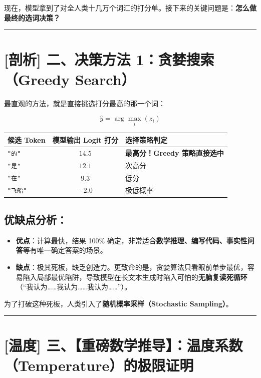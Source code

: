 现在，模型拿到了对全人类十几万个词汇的打分单。接下来的关键问题是：\textbf{怎么做最终的选词决策？}

\vspace{0.8em}\hrule\vspace{0.8em}

\section{[剖析] 二、决策方法 1：贪婪搜索（Greedy Search）}

最直观的方法，就是直接挑选打分最高的那一个词：

\[
\hat{y} = \arg\max_{i} (z_i)
\]

\begin{center}
\small
\begin{tabularx}{0.7\textwidth}{l c X}
\toprule
\textbf{候选 Token} & \textbf{模型输出 Logit 打分} & \textbf{选择策略判定} \\
\midrule
\texttt{"的"} & $14.5$ & \textbf{最高分！Greedy 策略直接选中} \\
\texttt{"是"} & $12.1$ & 次高分 \\
\texttt{"在"} & $9.3$ & 低分 \\
\texttt{"飞船"} & $-2.0$ & 极低概率 \\
\bottomrule
\end{tabularx}
\end{center}

\subsection{优缺点分析：}

\begin{itemize}
  \item \textbf{优点}：计算最快，结果 100\% 确定，非常适合\textbf{数学推理、编写代码、事实性问答}等有唯一确定答案的场景。
  \item \textbf{缺点}：极其死板，缺乏创造力。更致命的是，贪婪算法只看眼前单步最优，容易陷入局部最优陷阱，导致模型在长文本生成时陷入可怕的\textbf{无脑复读死循环}（“我认为\dots{}\dots{}我认为\dots{}\dots{}我认为\dots{}\dots{}”）。
\end{itemize}

为了打破这种死板，人类引入了\textbf{随机概率采样（Stochastic Sampling）}。

\vspace{0.8em}\hrule\vspace{0.8em}

\section{[温度] 三、【重磅数学推导】：温度系数（Temperature）的极限证明}

